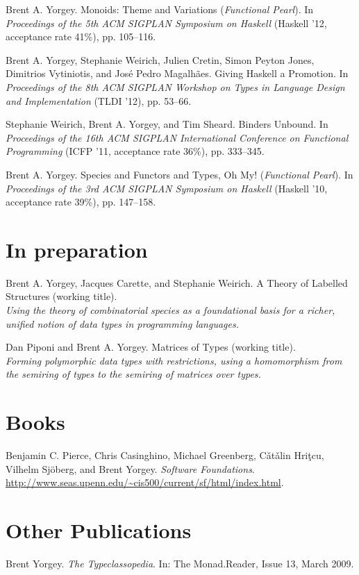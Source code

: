 \documentclass{article}
\newcommand{\cvitem}{\par\hangpara{2em}{1}}
\begin{document}
\cvitem Brent A. Yorgey. Monoids: Theme and Variations
(\emph{Functional Pearl}).  In \emph{Proceedings of the 5th ACM
  SIGPLAN Symposium on Haskell} (Haskell '12, acceptance rate 41\%),
pp. 105--116.

\cvitem Brent A. Yorgey, Stephanie Weirich, Julien Cretin, Simon
Peyton Jones, Dimitrios Vytiniotis, and Jos\'e Pedro
Magalh\~aes. Giving Haskell a Promotion. In \emph{Proceedings of the
  8th ACM SIGPLAN Workshop on Types in Language Design and
  Implementation} (TLDI '12), pp. 53--66.

\cvitem Stephanie Weirich, Brent A. Yorgey, and Tim Sheard. Binders
Unbound. In \emph{Proceedings of the 16th ACM SIGPLAN International
  Conference on Functional Programming} (ICFP '11, acceptance rate
  36\%), pp. 333--345.

\cvitem Brent A. Yorgey. Species and Functors and Types, Oh
  My! (\emph{Functional Pearl}). In \emph{Proceedings of the 3rd ACM SIGPLAN
  Symposium on Haskell} (Haskell '10, acceptance rate 39\%), pp. 147--158.

\section*{In preparation}

\cvitem Brent A. Yorgey, Jacques Carette, and Stephanie Weirich.
A Theory of Labelled Structures (working title). \\
\emph{Using the theory of combinatorial species as a foundational
  basis for a richer, unified notion of data types in programming
  languages.}

\cvitem Dan Piponi and Brent A. Yorgey. Matrices of Types (working
title). \\
\emph{Forming polymorphic data types with restrictions, using a
  homomorphism from the semiring of types to the semiring of matrices
  over types.}

\section*{Books}
\cvitem Benjamin C. Pierce, Chris Casinghino, Michael Greenberg,
C{\v a}t{\v a}lin Hri{\c t}cu, Vilhelm Sj\"oberg, and Brent Yorgey. \emph{Software
  Foundations}. \url{http://www.seas.upenn.edu/~cis500/current/sf/html/index.html}.

\section*{Other Publications}
\cvitem Brent Yorgey. \emph{The Typeclassopedia}. In: The
Monad.Reader, Issue 13, March 2009.
\end{document}
